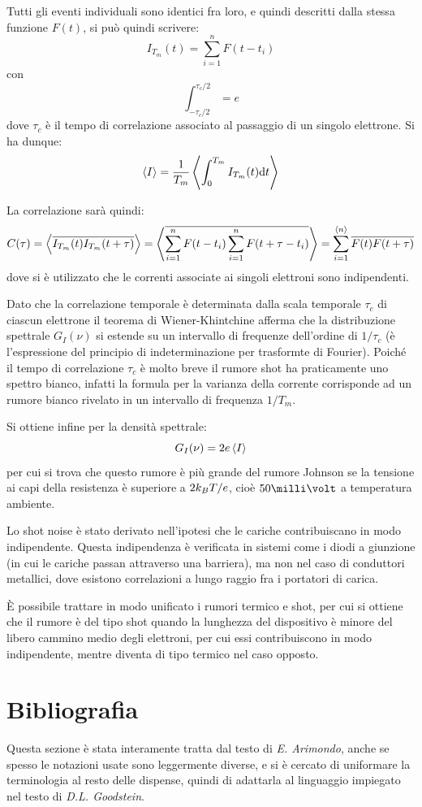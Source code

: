 Tutti gli eventi individuali sono identici fra loro, e quindi descritti dalla stessa funzione $ F(t) $, si può quindi scrivere:
\[ I_{T_m}(t) = \sum_{i =1}^n F(t-t_i) \]
con
\[ \int_{-\tau_c/2}^{\tau_c/2} = e \]
dove $ \tau_c $ è il tempo di correlazione associato al passaggio di un singolo elettrone. Si ha dunque:
\[ \expval{I} = \frac{1}{T_m} \expval{\int_{0}^{T_m} I_{T_m}(t) \dd t} \]

La correlazione sarà quindi:
\begin{align*}
C(\tau) = \expval{\overline{I_{T_m}(t) I_{T_m}(t + \tau)}} = \expval{\overline{\sum_{i =1}^n F(t-t_i) \sum_{i =1}^n F(t + \tau -t_i)}} = \sum_{i =1}^{\expval{n}} \overline{F(t) F(t + \tau)}
\end{align*}
dove si è utilizzato che le correnti associate ai singoli elettroni sono indipendenti.

Dato che la correlazione temporale è determinata dalla scala temporale $ \tau_c $ di ciascun elettrone il teorema di Wiener-Khintchine afferma che la distribuzione spettrale $ G_I(\nu) $ si estende su un intervallo di frequenze dell'ordine di $ 1/\tau_c $ (è l'espressione del principio di indeterminazione per trasformte di Fourier).
Poiché il tempo di correlazione $ \tau_c $ è molto breve il rumore shot ha praticamente uno spettro bianco, infatti la formula per la varianza della corrente corrisponde ad un rumore bianco rivelato in un intervallo di frequenza $ 1/T_m $.

Si ottiene infine per la densità spettrale:
\[ G_I (\nu) = 2 e \expval{I} \]
per cui si trova che questo rumore è più grande del rumore Johnson se la tensione ai capi della resistenza è superiore a $ 2k_B T/e $, cioè $ 50 \milli\volt $ a temperatura ambiente.

\begin{oss}
	Lo shot noise è stato derivato nell'ipotesi che le cariche contribuiscano in modo indipendente. Questa indipendenza è verificata in sistemi come i diodi a giunzione (in cui le cariche passan attraverso una barriera), ma non nel caso di conduttori metallici, dove esistono correlazioni a lungo raggio fra i portatori di carica.
\end{oss}
\begin{oss}
	\`E possibile trattare in modo unificato i rumori termico e shot, per cui si ottiene che il rumore è del tipo shot quando la lunghezza del dispositivo è minore del libero cammino medio degli elettroni, per cui essi contribuiscono in modo indipendente, mentre diventa di tipo termico nel caso opposto.
\end{oss}

\section{Bibliografia}

Questa sezione è stata interamente tratta dal testo di \textit{E. Arimondo}, anche se spesso le notazioni usate sono leggermente diverse, e si è cercato di uniformare la terminologia al resto delle dispense, quindi di adattarla al linguaggio impiegato nel testo di \textit{D.L. Goodstein}.